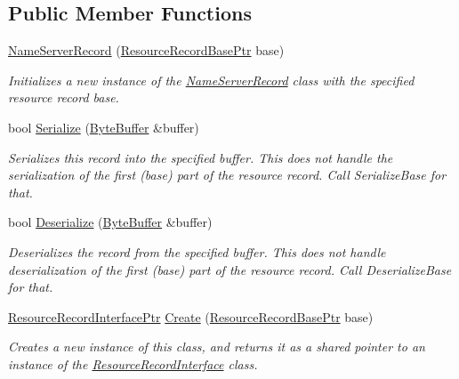 \subsection*{Public Member Functions}
\begin{DoxyCompactItemize}
\item 
\hyperlink{class_senergy_1_1_dns_1_1_name_server_record_a435c6b989e070adcfce7b72c02ae83fb}{Name\-Server\-Record} (\hyperlink{namespace_senergy_1_1_dns_a72915c893fbf242018e79d8f92e1646b}{Resource\-Record\-Base\-Ptr} base)
\begin{DoxyCompactList}\small\item\em Initializes a new instance of the \hyperlink{class_senergy_1_1_dns_1_1_name_server_record}{Name\-Server\-Record} class with the specified resource record base. \end{DoxyCompactList}\item 
bool \hyperlink{class_senergy_1_1_dns_1_1_name_server_record_a9e9b980a9c341cff47bb5840fc01ed06}{Serialize} (\hyperlink{class_senergy_1_1_byte_buffer}{Byte\-Buffer} \&buffer)
\begin{DoxyCompactList}\small\item\em Serializes this record into the specified buffer. This does not handle the serialization of the first (base) part of the resource record. Call Serialize\-Base for that. \end{DoxyCompactList}\item 
bool \hyperlink{class_senergy_1_1_dns_1_1_name_server_record_a6e01ac3f215b4766cae9ccc7fa58987a}{Deserialize} (\hyperlink{class_senergy_1_1_byte_buffer}{Byte\-Buffer} \&buffer)
\begin{DoxyCompactList}\small\item\em Deserializes the record from the specified buffer. This does not handle deserialization of the first (base) part of the resource record. Call Deserialize\-Base for that. \end{DoxyCompactList}\item 
\hyperlink{class_senergy_1_1_dns_1_1_resource_record_interface_abf5eec20c95f05b57c5c02eaed349e16}{Resource\-Record\-Interface\-Ptr} \hyperlink{class_senergy_1_1_dns_1_1_name_server_record_a006930a7fc6c7d736cfe5c0ee1d79b9d}{Create} (\hyperlink{namespace_senergy_1_1_dns_a72915c893fbf242018e79d8f92e1646b}{Resource\-Record\-Base\-Ptr} base)
\begin{DoxyCompactList}\small\item\em Creates a new instance of this class, and returns it as a shared pointer to an instance of the \hyperlink{class_senergy_1_1_dns_1_1_resource_record_interface}{Resource\-Record\-Interface} class. \end{DoxyCompactList}\item 

\end{DoxyCompactItemize}
